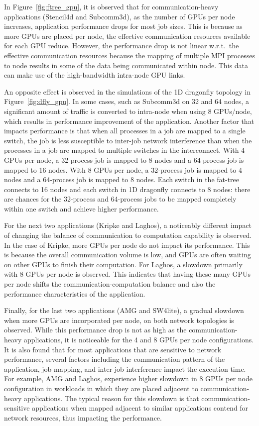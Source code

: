 In Figure~\ref{fig:ftree_gpu}, it is observed that for communication-heavy
applications (Stencil4d and Subcomm3d), as the number of GPUs per node
increases, application performance drops for most job sizes. This is because
as more GPUs are placed per node, the effective communication resources
available for each GPU reduce. However, the performance drop is not linear
w.r.t.~the effective communication resources because the mapping of multiple
MPI processes to node results in some of the data being communicated within
node. This data can make use of the high-bandwidth intra-node GPU links.

An opposite effect is observed in the simulations of the 1D dragonfly
topology in Figure~\ref{fig:dfly_gpu}. In some cases, such as Subcomm3d on
32 and 64 nodes, a significant amount of traffic is converted to intra-node
when using 8 GPUs/node, which results in performance improvement of the
application.  Another factor that impacts performance is that when all
processes in a job are mapped to a single switch, the job is less
susceptible to inter-job network interference than when the processes in a
job are mapped to multiple switches in the interconnect.  With 4 GPUs per
node, a 32-process job is mapped to 8 nodes and a 64-process job is mapped
to 16 nodes.  With 8 GPUs per node, a 32-process job is mapped to 4 nodes
and a 64-process job is mapped to 8 nodes.  Each switch in the fat-tree
connects to 16 nodes and each switch in 1D dragonfly connects to 8 nodes:
there are chances for the 32-process and 64-process jobs to be mapped
completely within one switch and achieve higher performance.  

For the next two applications (Kripke and Laghos), a noticeably
different impact of changing the balance of communication to computation
capability is observed. In the case of Kripke, more GPUs per node do not impact its performance. This
is because the overall communication volume is low, and GPUs are often waiting
on other GPUs to finish their computation. For Laghos, a
slowdown primarily with 8 GPUs per node is observed. This indicates that having these many
GPUs per node shifts the communication-computation balance and also the performance 
characteristics of the application.

Finally, for the last two applications (AMG and SW4lite), a gradual
slowdown when more GPUs are incorporated per node, on both network topologies is observed. While this performance drop
is not as high as the communication-heavy applications, it is noticeable for the 4
and 8 GPUs per node configurations.  It is also found that for most
applications that are sensitive to network performance, several factors
including the communication pattern of the application, job mapping, and
inter-job interference impact the execution time. For example, AMG and Laghos,
experience higher slowdown in 8 GPUs per node configuration in workloads in
which they are placed adjacent to communication-heavy applications. 
The typical reason for
this slowdown is that communication-sensitive applications when mapped
adjacent to similar applications contend for network resources, thus impacting
the performance.

